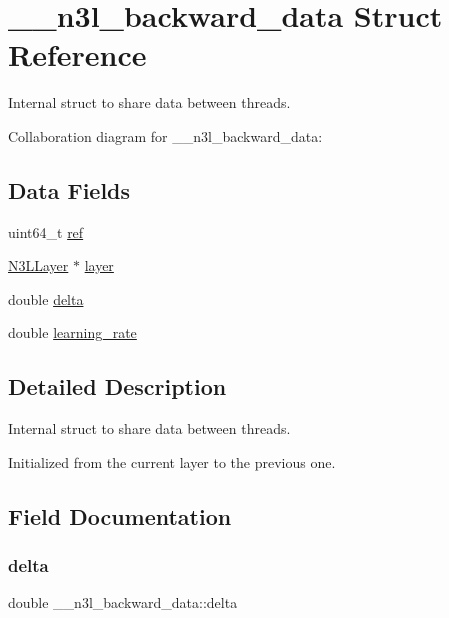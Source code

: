 \hypertarget{struct____n3l__backward__data}{}\section{\+\_\+\+\_\+n3l\+\_\+backward\+\_\+data Struct Reference}
\label{struct____n3l__backward__data}


Internal struct to share data between threads.  




Collaboration diagram for \+\_\+\+\_\+n3l\+\_\+backward\+\_\+data\+:
\subsection*{Data Fields}
\begin{DoxyCompactItemize}
\item 
uint64\+\_\+t \mbox{\hyperlink{struct____n3l__backward__data_a32ef8a9b7e79121a563b8cd5486f88d3}{ref}}
\item 
\mbox{\hyperlink{struct__n3l__layer}{N3\+L\+Layer}} $\ast$ \mbox{\hyperlink{struct____n3l__backward__data_a0dcc17f32256df3e7ec65046236ffd24}{layer}}
\item 
double \mbox{\hyperlink{struct____n3l__backward__data_ab41bb2c143496d239fe41b208809cc85}{delta}}
\item 
double \mbox{\hyperlink{struct____n3l__backward__data_aa29c1bf7dcb85bfaaa0ec9b01cecc425}{learning\+\_\+rate}}
\end{DoxyCompactItemize}


\subsection{Detailed Description}
Internal struct to share data between threads. 

Initialized from the current layer to the previous one. 

\subsection{Field Documentation}
\mbox{\label{struct____n3l__backward__data_ab41bb2c143496d239fe41b208809cc85}} 
\subsubsection{\texorpdfstring{delta}{delta}}
{\footnotesize\ttfamily double \+\_\+\+\_\+n3l\+\_\+backward\+\_\+data\+::delta}

